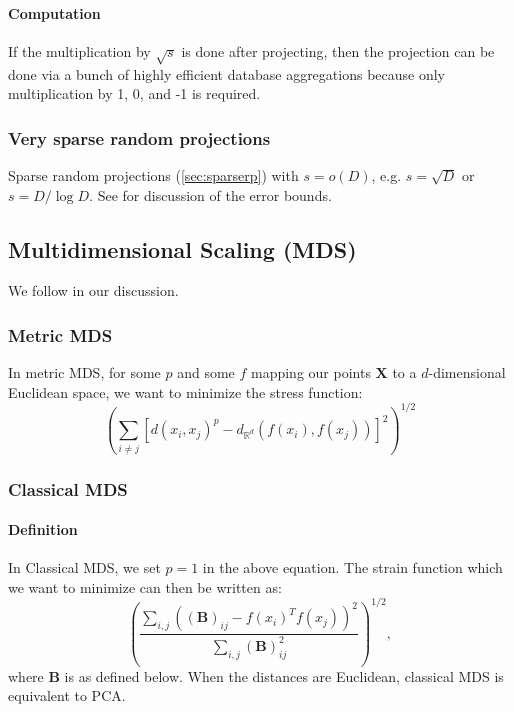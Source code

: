 \documentclass[12pt,a4paper]{article}
\newcommand{\1}[1]{\mathds{1}\left[#1\right]}
\newcommand{\B}[1]{\mathbf{#1}}
\begin{document}
\paragraph{Computation} If the multiplication by $\sqrt{s}$ is done after projecting, then the projection can be done via a bunch of highly efficient database aggregations because only multiplication by 1, 0, and -1 is required.
\subsubsection{Very sparse random projections}
Sparse random projections (\ref{sec:sparserp}) with $s=o(D)$, e.g. $s=\sqrt{D}$ or $s=D/\log D$. See \cite{verysparse} for discussion of the error bounds.

\subsection{Multidimensional Scaling (MDS)}\label{sec:mds}
We follow \cite{modernmds} in our discussion.

\subsubsection{Metric MDS}
In metric MDS, for some $p$ and some $f$ mapping our points $\B X$ to a $d$-dimensional Euclidean space, we want to minimize the stress function:
\[\left(\sum_{i\neq j}[d(x_i,x_j)^p-d_{\mathbb{R}^d}(f(x_i),f(x_j))]^2\right)^{1/2}\]
\subsubsection{Classical MDS}\label{sec:classical-mds}
\paragraph{Definition} In Classical MDS, we set $p=1$ in the above equation. The strain function which we want to minimize can then be written as:
\[\left(\frac{\sum_{i,j} ((\B B)_{ij}-f(x_i)^Tf(x_j))^2}{\sum_{i,j}(\B B)_{ij}^2}\right)^{1/2},\]
where $\B B$ is as defined below.
When the distances are Euclidean, classical MDS is equivalent to PCA.
\end{document}
